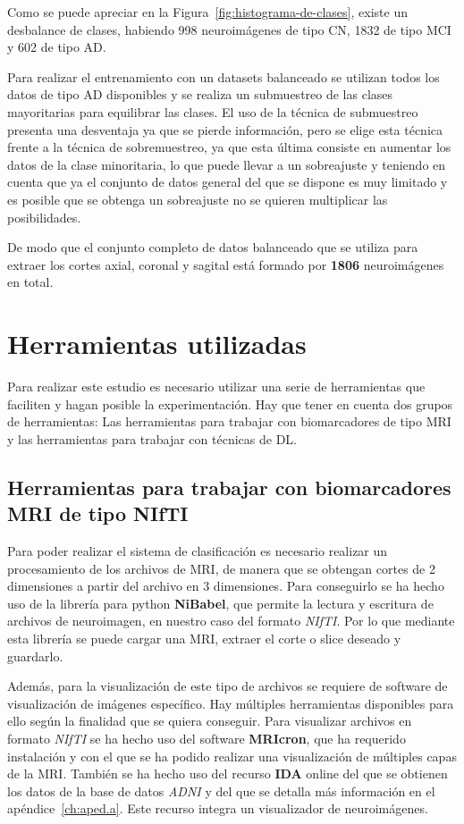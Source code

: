 Como se puede apreciar en la Figura~\ref{fig:histograma-de-clases}, existe un desbalance de clases, habiendo 998
neuroimágenes de tipo CN, 1832 de tipo MCI y 602 de tipo AD.

Para realizar el entrenamiento con un datasets balanceado se utilizan todos los datos de tipo AD disponibles y se
realiza un submuestreo de las clases mayoritarias para equilibrar las clases.
El uso de la técnica de submuestreo presenta una desventaja ya que se pierde información, pero se elige esta técnica
frente a la técnica de sobremuestreo, ya que esta última consiste en aumentar los datos de la clase minoritaria, lo
que puede llevar a un sobreajuste y teniendo en cuenta que ya el conjunto de datos general del que se dispone es muy
limitado y es posible que se obtenga un sobreajuste no se quieren multiplicar las posibilidades.

De modo que el conjunto completo de datos balanceado que se utiliza para extraer los cortes axial, coronal y sagital
está formado por \textbf{1806} neuroimágenes en total.

\section{Herramientas utilizadas}\label{sec:herramientas-utilizadas}
Para realizar este estudio es necesario utilizar una serie de herramientas que faciliten y hagan posible la 
experimentación.
Hay que tener en cuenta dos grupos de herramientas: Las herramientas para trabajar con biomarcadores de tipo MRI y las 
herramientas para trabajar con técnicas de DL.

\subsection{Herramientas para trabajar con biomarcadores MRI de tipo NIfTI}
\label{subsec:herramientas-para-trabajar-con-biomarcadores-mri-de-tipo-nifti}
Para poder realizar el sistema de clasificación es necesario realizar un procesamiento de los archivos de MRI, de 
manera que se obtengan cortes de 2 dimensiones a partir del archivo en 3 dimensiones.
Para conseguirlo se ha hecho uso de la librería para python \textbf{NiBabel}, que permite la lectura y escritura  de 
archivos de neuroimagen, en nuestro caso del formato \textit{NIfTI}.
Por lo que mediante esta librería se puede cargar una MRI, extraer el corte o slice deseado y guardarlo.

Además, para la visualización de este tipo de archivos se requiere de software de visualización de imágenes específico.
Hay múltiples herramientas disponibles para ello según la finalidad que se quiera conseguir.
Para visualizar archivos en formato \textit{NIfTI} se ha hecho uso del software \textbf{MRIcron}, que ha requerido 
instalación y con el que se ha podido realizar una visualización de múltiples capas de la MRI. También se ha hecho uso 
del recurso \textbf{IDA} online del que se obtienen los datos de la base de datos \textit{ADNI} y del que se detalla más
información en el apéndice~\ref{ch:aped.a}.
Este recurso integra un visualizador de neuroimágenes.


